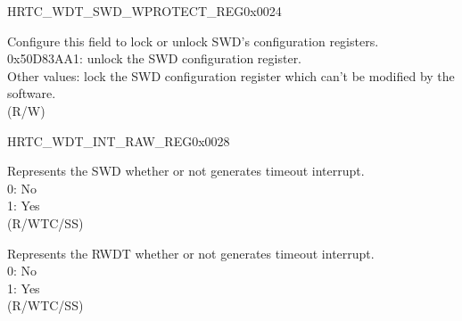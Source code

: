 \begin{register}{H}{RTC\_WDT\_SWD\_WPROTECT\_REG}{0x0024}\label{regdesc:RTCWDTSWDWPROTECTREG}
%
\regnewline%
\begin{regdesc}\begin{reglist}
\label{fielddesc:RTCWDTSWDWKEY}\item [RTC\_WDT\_SWD\_WKEY] Configure this field to lock or unlock SWD's configuration registers.\\
0x50D83AA1: unlock the SWD configuration register. \\
Other values: lock the SWD configuration register which can't be modified by the software.\\
 (R/W)
\end{reglist}\end{regdesc}
\end{register}


\begin{register}{H}{RTC\_WDT\_INT\_RAW\_REG}{0x0028}\label{regdesc:RTCWDTINTRAWREG}
%
%
%
\regnewline%
\begin{regdesc}\begin{reglist}
\label{fielddesc:RTCWDTSUPERWDTINTRAW}\item [RTC\_WDT\_SWD\_INT\_RAW] Represents the SWD whether or not generates timeout interrupt.\\
0: No \\
1: Yes  \\ (R/WTC/SS)
\label{fielddesc:RTCWDTINTRAW}\item [RTC\_WDT\_INT\_RAW] Represents the RWDT whether or not generates timeout interrupt.\\
0: No \\
1: Yes  \\ (R/WTC/SS)
\end{reglist}\end{regdesc}
\end{register}


